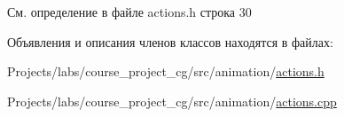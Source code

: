 См. определение в файле actions.\+h строка 30



Объявления и описания членов классов находятся в файлах\+:\begin{DoxyCompactItemize}
\item 
Projects/labs/course\+\_\+project\+\_\+cg/src/animation/\hyperlink{actions_8h}{actions.\+h}\item 
Projects/labs/course\+\_\+project\+\_\+cg/src/animation/\hyperlink{actions_8cpp}{actions.\+cpp}\end{DoxyCompactItemize}
